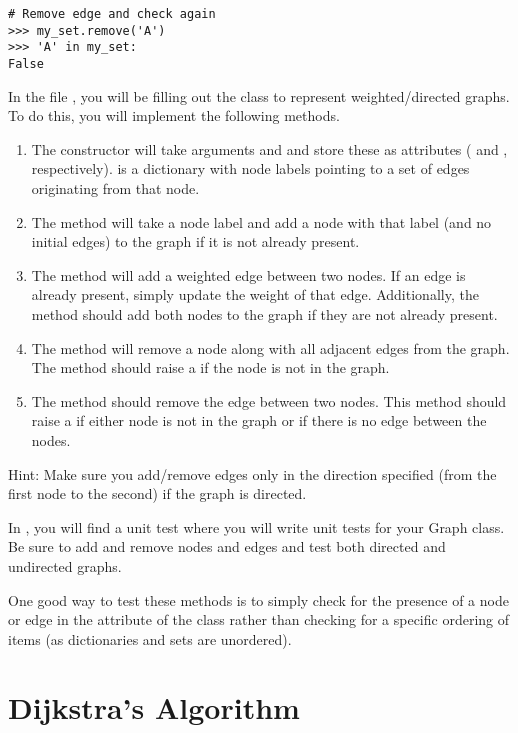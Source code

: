 \begin{problem}
\begin{lstlisting}
# Remove edge and check again
>>> my_set.remove('A')
>>> 'A' in my_set:
False
\end{lstlisting}
In the file , you will be filling out the  class to represent weighted/directed graphs.
To do this, you will implement the following methods.
\begin{enumerate}
    \item The constructor  will take arguments  and  and store these as attributes ( and , respectively).  is a dictionary with node labels pointing to a set of edges originating from that node.
    \item The  method will take a node label  and add a node with that label (and no initial edges) to the graph if it is not already present.
    \item The  method will add a weighted edge between two nodes. If an edge is already present, simply update the weight of that edge. Additionally, the method should add both nodes to the graph if they are not already present.
    \item The  method will remove a node along with all adjacent edges from the graph. The method should raise a  if the node is not in the graph.
    \item The  method should remove the edge between two nodes. This method should raise a  if either node is not in the graph or if there is no edge between the nodes.
\end{enumerate}
Hint: Make sure you add/remove edges only in the direction specified (from the first node to the second) if the graph is directed.
\end{problem}

\begin{unittest}
    In , you will find a unit test  where you will write unit tests for your Graph class.
    Be sure to add and remove nodes and edges and test both directed and undirected graphs.

    One good way to test these methods is to simply check for the presence of a node or edge in the  attribute of the  class rather than checking for a specific ordering of items (as dictionaries and sets are unordered).
\end{unittest}

\section*{Dijkstra's Algorithm} %

